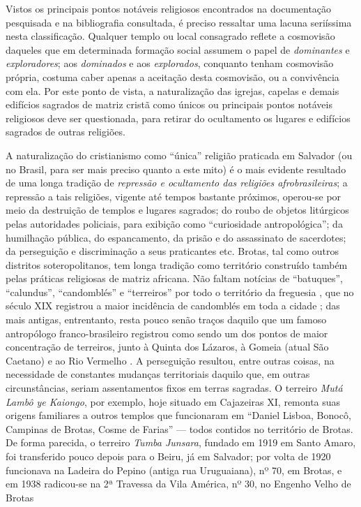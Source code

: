 Vistos os principais pontos notáveis religiosos encontrados na documentação pesquisada e na bibliografia consultada, é preciso ressaltar uma lacuna seriíssima nesta classificação. Qualquer templo ou local consagrado reflete a cosmovisão daqueles que em determinada formação social assumem o papel de \textit{dominantes} e \textit{exploradores}; aos \textit{dominados} e aos \textit{explorados}, conquanto tenham cosmovisão própria, costuma caber apenas a aceitação desta cosmovisão, ou a convivência com ela. Por este ponto de vista, a naturalização das igrejas, capelas e demais edifícios sagrados de matriz cristã como únicos ou principais pontos notáveis religiosos deve ser questionada, para retirar do ocultamento os lugares e edifícios sagrados de outras religiões.

A naturalização do cristianismo como ``única'' religião praticada em Salvador (ou no Brasil, para ser mais preciso quanto a este mito) é o mais evidente resultado de uma longa tradição de \textit{repressão e ocultamento das religiões afrobrasileiras}; a repressão a tais religiões, vigente até tempos bastante próximos, operou-se por meio da destruição de templos e lugares sagrados; do roubo de objetos litúrgicos pelas autoridades policiais, para exibição como ``curiosidade antropológica''; da humilhação pública, do espancamento, da prisão e do assassinato de sacerdotes; da perseguição e discriminação a seus praticantes etc. Brotas, tal como outros distritos soteropolitanos, tem longa tradição como território construído também pelas práticas religiosas de matriz africana. Não faltam notícias de ``batuques'', ``calundus'', ``candomblés'' e ``terreiros'' por todo o território da freguesia \cite{carneiro_candomble_1954,reis_domingos_2008,REISSILVA1989}, que no século XIX registrou a maior incidência de candomblés em toda a cidade \cite[p.~60]{santana_itiner_2008}; das mais antigas, entrentanto, resta pouco senão traços daquilo que um famoso antropólogo franco-brasileiro registrou como sendo um dos pontos de maior concentração de terreiros, junto à Quinta dos Lázaros, à Gomeia (atual São Caetano) e ao Rio Vermelho \cite{bastide_mystique_1978}. A perseguição resultou, entre outras coisas, na necessidade de constantes mudanças territoriais daquilo que, em outras circunstâncias, seriam assentamentos fixos em terras sagradas. O terreiro \textit{Mutá Lambô ye Kaiongo}, por exemplo, hoje situado em Cajazeiras XI, remonta suas origens familiares a outros templos que funcionaram em ``Daniel Lisboa, Bonocô, Campinas de Brotas, Cosme de Farias'' \cite[p.~50]{alves_paquetan_2010} --- todos contidos no território de Brotas. De forma parecida, o terreiro \textit{Tumba Junsara}, fundado em 1919 em Santo Amaro, foi transferido pouco depois para o Beiru, já em Salvador; por volta de 1920 funcionava na Ladeira do Pepino (antiga rua Uruguaiana), nº 70, em Brotas, e em 1938 radicou-se na 2ª Travessa da Vila América, nº 30, no Engenho Velho de Brotas \cite[p.~61]{rego_terreiros_2006}

